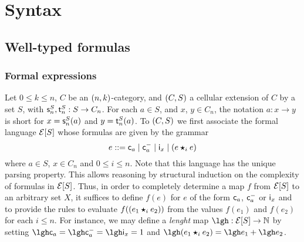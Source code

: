 \section{Syntax}\label{sec:syntax}

\subsection{Well-typed formulas}\label{subsec:wtform}

\subsubsection{Formal expressions}\label{ssubsec:formex}
Let $0\leq k\leq n$, $C$ be an $(n,k)$-category, and  $(C,S)$ a
cellular extension of $C$ by a set $S$, with $\mathsf{s}_{n}^S,\mathsf{t}_{n}^S:S\to C_n$. For each $a\in S$, and $x$,
$y\in C_n$, the notation $a:x\to y$ is short for 
$x=\mathsf{s}_{n}^S(a)$ and $y=\mathsf{t}_{n}^S(a)$. To $(C,S)$ we first associate
the formal language $\mathcal{E}[S]$ whose formulas are given by the grammar
\[
  e ::= \mathsf{c}_{a} \mid \mathsf{c}^{-}_{a} \mid \mathsf{i}_{x} \mid (e\bm{\star}_{i} e)
\]
where $a\in S$, $x\in C_n$ and $0\leq i\leq n$. Note that this
language has the unique parsing property. This allows reasoning by
structural induction on the complexity of formulas in $\mathcal{E}[S]$. Thus,
in order to completely determine a map $f$ from $\mathcal{E}[S]$ to an arbitrary
set $X$, it suffices to define $f(e)$ for $e$ of the form $\mathsf{c}_{a}$,
$\mathsf{c}^{-}_{a}$ or $\mathsf{i}_{x}$ and to provide the rules to evaluate $f((e_1\bm{\star}_{i} e_2))$ from the values $f(e_1)$ and $f(e_2)$ for each $i\leq n$.
For instance, we may define a {\em lenght} map $\lgh:\expr S\to \N$
by setting $\lgh \fcst a=\lgh\finv a= \lgh \fid x=1$ and $\lgh
(e_1\fcomp i e_2)=\lgh e_1+\lgh e_2$. 



